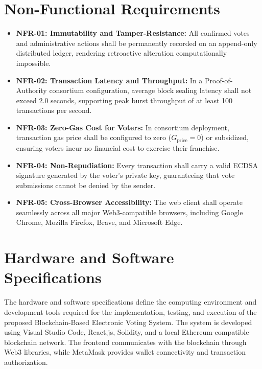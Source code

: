 \documentclass[12pt,a4paper]{report}
\begin{document}
\section{Non-Functional Requirements}
\begin{itemize}
    \item \textbf{NFR-01: Immutability and Tamper-Resistance:} All confirmed votes and administrative actions shall be permanently recorded on an append-only distributed ledger, rendering retroactive alteration computationally impossible.
    \item \textbf{NFR-02: Transaction Latency and Throughput:} In a Proof-of-Authority consortium configuration, average block sealing latency shall not exceed 2.0 seconds, supporting peak burst throughput of at least 100 transactions per second.
    \item \textbf{NFR-03: Zero-Gas Cost for Voters:} In consortium deployment, transaction gas price shall be configured to zero ($G_{\text{price}} = 0$) or subsidized, ensuring voters incur no financial cost to exercise their franchise.
    \item \textbf{NFR-04: Non-Repudiation:} Every transaction shall carry a valid ECDSA signature generated by the voter's private key, guaranteeing that vote submissions cannot be denied by the sender.
    \item \textbf{NFR-05: Cross-Browser Accessibility:} The web client shall operate seamlessly across all major Web3-compatible browsers, including Google Chrome, Mozilla Firefox, Brave, and Microsoft Edge.
\end{itemize}

\clearpage
\section{\fontsize{12}{14}\selectfont Hardware and Software Specifications}
{\fontsize{9.8pt}{11pt}\selectfont The hardware and software specifications define the computing environment and development tools required for the implementation, testing, and execution of the proposed Blockchain-Based Electronic Voting System. The system is developed using Visual Studio Code, React.js, Solidity, and a local Ethereum-compatible blockchain network. The frontend communicates with the blockchain through Web3 libraries, while MetaMask provides wallet connectivity and transaction authorization.\par}
\end{document}
